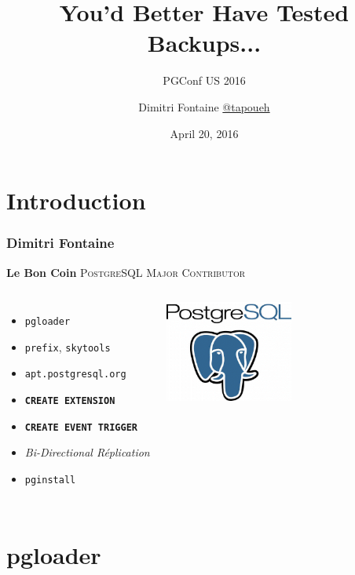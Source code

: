 \documentclass{beamer}
\title{You'd Better Have Tested Backups...}
\subtitle{PGConf US 2016}
\author{Dimitri Fontaine \url{@tapoueh}}
\date{April 20, 2016}
\begin{document}
\frame{\titlepage}

\section{Introduction}

\begin{frame}[fragile]
  \frametitle{Dimitri Fontaine}

  \begin{center}
    \textbf{Le Bon Coin}
    \vfill
    {\Large \textsc{PostgreSQL Major Contributor}}
  \end{center}

\begin{columns}[c]

  \begin{itemize}
   \item \texttt{pgloader}
   \item \texttt{prefix}, \texttt{skytools}
   \item \texttt{apt.postgresql.org}
   \item \texttt{\textbf{CREATE EXTENSION}}
   \item \texttt{\textbf{CREATE EVENT TRIGGER}}
   \item \textit{Bi-Directional Réplication}
   \item \texttt{pginstall}
  \end{itemize}  

\begin{center}
  \includegraphics[height=9em]{postgres-logo.png}
\end{center}
\end{columns}
\end{frame}

\section{pgloader}
\end{document}
